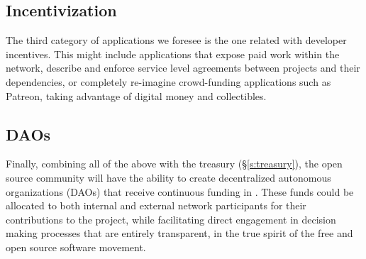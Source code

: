 \subsection{Incentivization}
The third category of applications we foresee is the one related with
developer incentives. This might include applications that expose paid work
within the \oscoin{} network, describe and enforce service level agreements
between projects and their dependencies, or completely re-imagine crowd-funding
applications such as Patreon, taking advantage of digital money and collectibles.

\subsection{DAOs}
Finally, combining all of the above with the \oscoin{} treasury
(\S\ref{s:treasury}), the open source community will have the ability to create
decentralized autonomous organizations (DAOs) that receive continuous funding
in \oscoin{}.  These funds could be allocated to both internal and external
network participants for their contributions to the project, while facilitating
direct engagement in decision making processes that are entirely transparent,
in the true spirit of the free and open source software movement.
